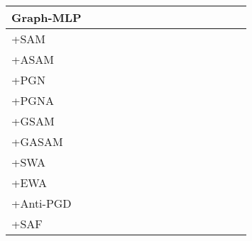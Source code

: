\documentclass[runningheads]{llncs}
\newcommand{\GraphMLP}{Graph-MLP\xspace}
\newcommand\good[1]{\textcolor{forestgreen}{#1}}
\newcommand\bad[1]{\textcolor{red}{#1}}
\begin{document}
\begin{table*}[!ht]
{\begin{tabular}{l|r r r | r r r | r r r | r r | r r | r}
\midrule
   \GraphMLP &  &  &  &  &  &  &  &  &  &  &  &  &  &  \\
  \hline
 +SAM & \good{} & \good{} & \good{} & \bad{} & \good{} & \good{} & \good{} & \good{} & \bad{} & \bad{} & \good{} & \good{} & \good{} & \good{} \\
 +ASAM & \good{} & \bad{} & \good{} & \bad{} & \good{} & \good{} & \good{} & \good{} & \good{} & \bad{} & \good{} & \good{} & \good{} & \good{} \\
 +PGN & \good{} & \good{} & \good{} & \good{} & \good{} & \good{} & \good{} & \bad{} & \good{} & \good{} & \good{} &  \good{} & \good{} &  \good{} \\
 +PGNA & \good{} & \good{} & \good{} & \bad{} & \good{} & \bad{} & \good{} & \good{} & \good{} & \good{} & \good{} & \good{} & \good{} & \good{} \\
 +GSAM & \good{} & \good{} & \good{} & \bad{} & \good{} & \bad{} & \good{} & \good{} & \bad{} & \bad{} & \good{} & \good{} & \good{} & \good{} \\
 +GASAM & \good{} & \good{} & \good{} & \bad{} & \good{} & \bad{} & \good{} & \good{} & \good{} & \bad{} & \good{} & \good{} & \good{} & \good{} \\ \hline
 +SWA & \good{} & \bad{} & \good{} & \good{} & \good{} & \good{} & \bad{} & \good{} & \bad{} & \good{} & \good{} & \good{} & \good{} & \bad{} \\
 +EWA & \bad{} & \good{} & \good{} & \bad{} & \good{} & \good{} & \bad{} & \good{} & \good{} & \good{} & \good{} & \good{} & \bad{} & \good{} \\  \hline
 +Anti-PGD & \good{} & \bad{} & \good{} & \good{} & \good{} & \good{} & \bad{} & \bad{} & \good{} & \good{} & \good{} & \good{} & \good{} & \good{} \\
 +SAF & \bad{} & \good{} & \good{} & \bad{} & \good{} & \good{} & \good{} & \bad{} & \good{} & \good{} & \good{} & \good{} & \good{} & \bad{} \\

    \bottomrule
    \end{tabular}}
\end{table*}

 
\end{document}
